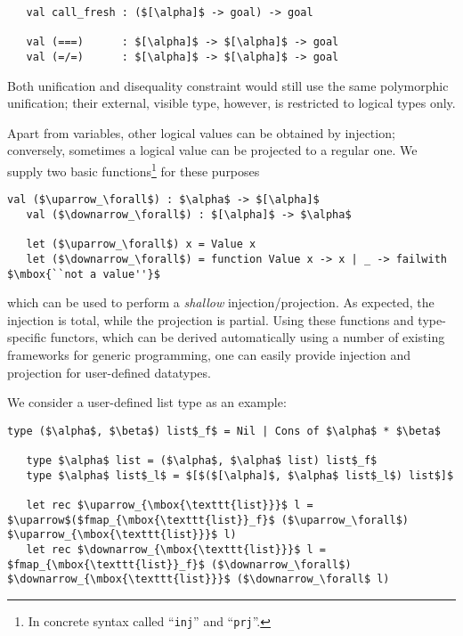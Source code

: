 \begin{lstlisting}
   val call_fresh : ($[\alpha]$ -> goal) -> goal

   val (===)      : $[\alpha]$ -> $[\alpha]$ -> goal
   val (=/=)      : $[\alpha]$ -> $[\alpha]$ -> goal
\end{lstlisting}

Both unification and disequality constraint would still use the same polymorphic unification; their external, visible type,
however, is restricted to logical types only.

Apart from variables, other logical values can be obtained by injection; conversely, sometimes a logical value can be projected to
a regular one. We supply two basic functions\footnote{In concrete syntax called ``\lstinline{inj}'' and ``\lstinline{prj}''.}
for these purposes

\begin{lstlisting}[mathescape=true]
   val ($\uparrow_\forall$) : $\alpha$ -> $[\alpha]$
   val ($\downarrow_\forall$) : $[\alpha]$ -> $\alpha$

   let ($\uparrow_\forall$) x = Value x
   let ($\downarrow_\forall$) = function Value x -> x | _ -> failwith $\mbox{``not a value''}$
\end{lstlisting}

which can be used to perform a \emph{shallow} injection/projection. As expected, the injection is total, while the projection is partial.
Using these functions and type-specific functors, which can be derived automatically using a number of existing frameworks for
generic programming, one can easily provide injection and projection for user-defined datatypes.

We consider a user-defined list type as an example:

\begin{lstlisting}[mathescape=true]
   type ($\alpha$, $\beta$) list$_f$ = Nil | Cons of $\alpha$ * $\beta$

   type $\alpha$ list = ($\alpha$, $\alpha$ list) list$_f$
   type $\alpha$ list$_l$ = $[$($[\alpha]$, $\alpha$ list$_l$) list$]$

   let rec $\uparrow_{\mbox{\texttt{list}}}$ l = $\uparrow$($fmap_{\mbox{\texttt{list}}_f}$ ($\uparrow_\forall$) $\uparrow_{\mbox{\texttt{list}}}$ l)
   let rec $\downarrow_{\mbox{\texttt{list}}}$ l = $fmap_{\mbox{\texttt{list}}_f}$ ($\downarrow_\forall$) $\downarrow_{\mbox{\texttt{list}}}$ ($\downarrow_\forall$ l)
\end{lstlisting}

